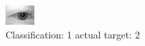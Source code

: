 \begin{figure}[h!]
\begin{center}
\includegraphics[width=0.60\columnwidth]{figures/ID454_class_1_target_2.png}
\end{center}
\caption{ Classification: 1 actual target: 2}
\label{fig:ID454_class_1_target_2}
\end{figure}
